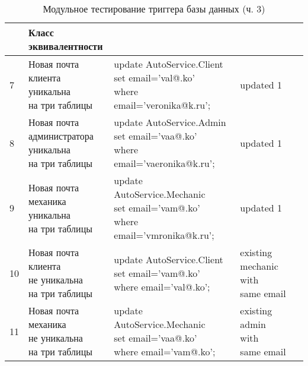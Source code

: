 \begin{table}[H]
	\centering
	\caption{\label{tab:teststrigger3}Модульное тестирование триггера базы данных (ч. 3)}
	\begin{tabular}{|l|l|l|l|}
		\hline \specialcell{№} & \specialcell{Класс\\эквивалентности} & \specialcell{Запрос для теста} & \specialcell{Результат}\\\hline
		7 & \makecell{Новая почта\\клиента уникальна\\на три таблицы} & \makecell{update  AutoService.Client\\
			set email='val@.ko'\\ where email='veronika@k.ru';} & updated 1 \\\hline
		8 & \makecell{Новая почта\\администратора\\уникальна\\на три таблицы} & \makecell{update  AutoService.Admin\\set email='vaa@.ko'\\where email='vaeronika@k.ru';} & updated 1 \\\hline
		9 & \makecell{Новая почта\\механика\\уникальна\\на три таблицы} & \makecell{update AutoService.Mechanic\\set email='vam@.ko'\\where email='vmronika@k.ru';} & updated 1 \\\hline
		10 & \makecell{Новая почта\\клиента\\не уникальна\\на три таблицы} & \makecell{update  AutoService.Client\\set email='vam@.ko'\\where email='val@.ko';} & \makecell{existing mechanic\\with\\same email} \\\hline
		11 & \makecell{Новая почта\\механика\\не уникальна\\на три таблицы} & \makecell{update  AutoService.Mechanic\\set email='vaa@.ko'\\where email='vam@.ko';} & \makecell{existing admin\\with\\same email}\\\hline

\end{tabular}
\end{table}
